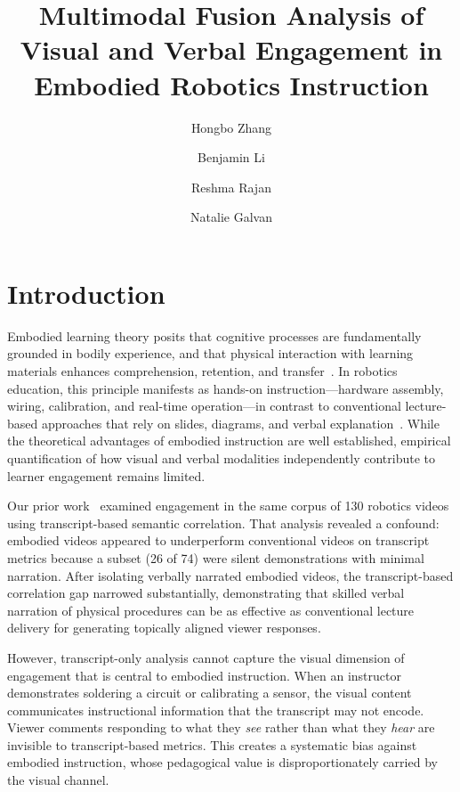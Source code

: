 \documentclass[fleqn,10pt]{wlscirep}
\title{Multimodal Fusion Analysis of Visual and Verbal Engagement in Embodied Robotics Instruction}
\author[1,*]{Hongbo Zhang}
\author[1]{Benjamin Li}
\author[1]{Reshma Rajan}
\author[1]{Natalie Galvan}
\affil[1]{Department of Engineering Technology, Middle Tennessee State University, Murfreesboro, TN 37132, USA}
\affil[*]{hbzhang@mtsu.edu}
\begin{document}
\flushbottom
\maketitle
\thispagestyle{empty}

\section*{Introduction}

Embodied learning theory posits that cognitive processes are fundamentally grounded in bodily experience, and that physical interaction with learning materials enhances comprehension, retention, and transfer~\cite{wilson2002six,barsalou2008grounded}. In robotics education, this principle manifests as hands-on instruction---hardware assembly, wiring, calibration, and real-time operation---in contrast to conventional lecture-based approaches that rely on slides, diagrams, and verbal explanation~\cite{johnson2014embodied}. While the theoretical advantages of embodied instruction are well established, empirical quantification of how visual and verbal modalities independently contribute to learner engagement remains limited.

Our prior work~\cite{zhang2025transcript} examined engagement in the same corpus of 130 robotics videos using transcript-based semantic correlation. That analysis revealed a confound: embodied videos appeared to underperform conventional videos on transcript metrics because a subset (26 of 74) were silent demonstrations with minimal narration. After isolating verbally narrated embodied videos, the transcript-based correlation gap narrowed substantially, demonstrating that skilled verbal narration of physical procedures can be as effective as conventional lecture delivery for generating topically aligned viewer responses.

However, transcript-only analysis cannot capture the visual dimension of engagement that is central to embodied instruction. When an instructor demonstrates soldering a circuit or calibrating a sensor, the visual content communicates instructional information that the transcript may not encode. Viewer comments responding to what they \emph{see} rather than what they \emph{hear} are invisible to transcript-based metrics. This creates a systematic bias against embodied instruction, whose pedagogical value is disproportionately carried by the visual channel.
\end{document}
